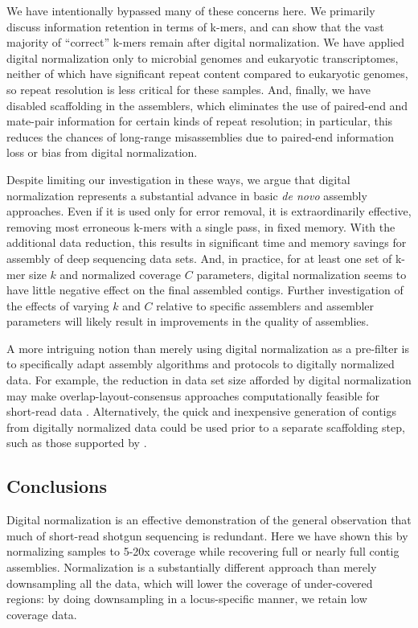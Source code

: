 \documentclass[10pt]{article}
\begin{document}
We have intentionally bypassed many of these concerns here. We
primarily discuss information retention in terms of k-mers, and can
show that the vast majority of ``correct'' k-mers remain after digital
normalization.  We have applied digital normalization only to
microbial genomes and eukaryotic transcriptomes, neither of which have
significant repeat content compared to eukaryotic genomes, so repeat
resolution is less critical for these samples.  And, finally, we have
disabled scaffolding in the assemblers, which eliminates the use of
paired-end and mate-pair information for certain kinds of repeat
resolution; in particular, this reduces the chances of long-range
misassemblies due to paired-end information loss or bias from digital
normalization.

Despite limiting our investigation in these ways, we argue that
digital normalization represents a substantial advance in basic {\em
  de novo} assembly approaches.  Even if it is used only for error
removal, it is extraordinarily effective, removing most erroneous
k-mers with a single pass, in fixed memory.  With the additional data
reduction, this results in significant time and memory savings for
assembly of deep sequencing data sets.  And, in practice, for at least
one set of k-mer size $k$ and normalized coverage $C$ parameters, digital
normalization seems to have little negative effect on the final
assembled contigs.  Further investigation of the effects of varying
$k$ and $C$ relative to specific assemblers and assembler parameters
will likely result in improvements in the quality of assemblies.

A more intriguing notion than merely using digital normalization as a
pre-filter is to specifically adapt assembly algorithms and protocols
to digitally normalized data.  For example, the reduction in data set
size afforded by digital normalization may make
overlap-layout-consensus approaches computationally feasible for
short-read data \cite{pubmed20211242}.  Alternatively, the quick and
inexpensive generation of contigs from digitally normalized data could
be used prior to a separate scaffolding step, such as those supported
by \cite{pubmed20529929,pubmed21926123}.

\subsection*{Conclusions}

Digital normalization is an effective demonstration of the general
observation that much of short-read shotgun sequencing is redundant.
Here we have shown this by normalizing samples to 5-20x coverage while
recovering full or nearly full contig assemblies.
Normalization is a substantially different approach than merely
downsampling all the data, which will lower the coverage of
under-covered regions: by doing downsampling in a locus-specific
manner, we retain low coverage data.
\end{document}

